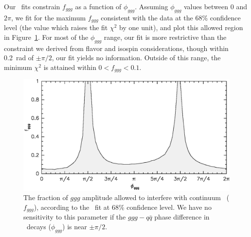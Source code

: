 \documentclass{cornell}
\begin{document}
Our \us\ fits constrain $f_{ggg}$ as a function of $\phi_{ggg}$.
Assuming $\phi_{ggg}$ values between $0$ and $2\pi$, we fit for the
maximum $f_{ggg}$ consistent with the data at the 68\% confidence
level (the value which raises the fit $\chi^2$ by one unit), and plot
this allowed region in Figure~\ref{intconstraint}.  For most of the
$\phi_{ggg}$ range, our fit is more restrictive than the constraint we
derived from flavor and isospin considerations, though within 0.2~rad
of $\pm\pi/2$, our fit yields no information.  Outside of this range,
the minimum $\chi^2$ is attained within $0 < f_{ggg} < 0.1$.

\begin{figure}[p]
  \begin{center}
    \includegraphics[width=0.8\linewidth]{intconstraint}
  \end{center}
  \caption[Upper limits on interference between Strong and
  Electromagnetic decays to hadrons]{\label{intconstraint} The fraction of $ggg$ amplitude
  allowed to interfere with continuum \qqbar\ ($f_{ggg}$), according
  to the \us\ fit at 68\% confidence level.  We have no sensitivity to
  this parameter if the $ggg - q\bar{q}$ phase difference in \ups\
  decays ($\phi_{ggg}$) is near $\pm\pi/2$.}
\end{figure}
\end{document}
